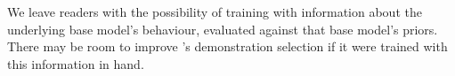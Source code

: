 
We leave readers with the possibility of training \sata with information about the underlying base model's behaviour, evaluated against that base model's priors. There may be room to improve \sata's demonstration selection if it were trained with this information in hand.
